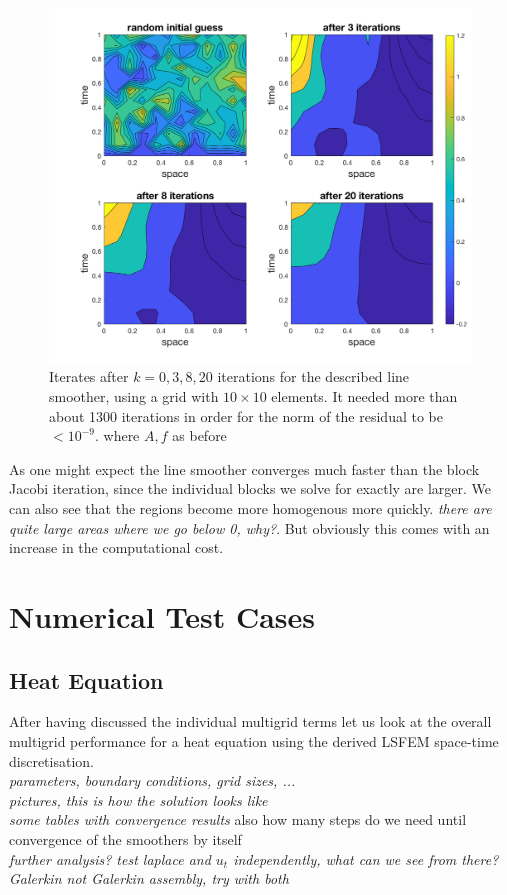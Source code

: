 \documentclass[../draft_1.tex]{subfiles}
\begin{document}
\begin{figure}[ht!]
	\centering
	\includegraphics[scale=0.28]{images/implementation/contour_plot_1_lineSm}
	\caption{Iterates after $k = 0,3,8, 20$ iterations for the described line smoother, using a grid with $10 \times 10$ elements. It needed more than about 1300 iterations in order for the norm of the residual to be $< 10^{-9}$. where $A, f$ as before}
\end{figure}

As one might expect the line smoother converges much faster than the block Jacobi iteration, since the individual blocks we solve for exactly are larger. We can also see that the regions become more homogenous more quickly. \textit{there are quite large areas where we go below 0, why?}. But obviously this comes with an increase in the computational cost. 


\section{Numerical Test Cases}
\subsection{Heat Equation}

After having discussed the individual multigrid terms let us look at the overall multigrid performance for a heat equation using the derived LSFEM space-time discretisation. 
\bigskip
\\
\textit{parameters, boundary conditions, grid sizes, ...}
\bigskip
\\
\textit{pictures, this is how the solution looks like}
\bigskip
\\
\textit{some tables with convergence results}
also how many steps do we need until convergence of the smoothers by itself
\bigskip
\\
\textit{further analysis? test laplace and $u_t$ independently, what can we see from there?}
\\
\textit{Galerkin not Galerkin assembly, try with both}
\end{document}
